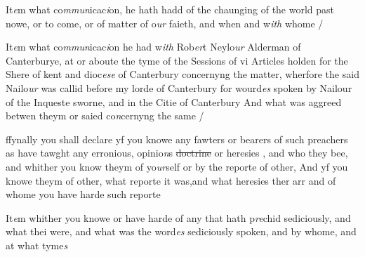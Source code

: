 \documentclass[12pt, a4paper]{book}
\begin{document}
	
				\marginpar[\vspace{0.5cm}{\textcolor{Gray}{17}}]{}
			
	
		\ifthenelse{\isodd{\thepage}}
		{\reversemarginpar}
		{\normalmarginpar}
		 It\textit{e}m what co\textit{mmun}icac\textit{i}on, he hath hadd of the chaunging of the world
 past nowe, or to come, or of matter of o\textit{ur} faieth, and when
 and w\textit{ith} whome /



				\marginpar[\vspace{0.5cm}{\textcolor{Gray}{18}}]{}
			
	
		\ifthenelse{\isodd{\thepage}}
		{\reversemarginpar}
		{\normalmarginpar}
		 It\textit{e}m what co\textit{mmun}icac\textit{i}on he had w\textit{ith} Rob\textit{er}t Neylo\textit{ur} Alderman of
		Canterburye, at or aboute the tyme of the Sessions of
		vi Articles holden for the Shere of kent and dioc\textit{ese} of Canterbury
		concernyng the matter, wherfore the said Nailo\textit{ur} was callid
		before my lorde of Canterbury for wourd\textit{es} spoken by Nailour
		of the Inqueste sworne, and in
			 the Citie of Canterbury
 And what was aggreed betwen theym or saied co\textit{n}cernyng
 the same /


	
				\marginpar[\vspace{0.5cm}{\textcolor{Gray}{19}}]{}
			
	
		\ifthenelse{\isodd{\thepage}}
		{\reversemarginpar}
		{\normalmarginpar}
		 ffynally you shall declare yf you knowe any fawters or
 bearers of such preachers as have tawght any erronious, opinio\textit{n}s
 \sout{doctrine} or heresies
			, and who they bee, and whither you know theym
 of yo\textit{ur}self or by the reporte of other, And yf you knowe theym
 of other, what reporte it was,and what heresies ther arr
 and of whome you have harde such reporte



	
				\marginpar[\vspace{0.5cm}{\textcolor{Gray}{20}}]{}
			
	
		\ifthenelse{\isodd{\thepage}}
		{\reversemarginpar}
		{\normalmarginpar}
		 It\textit{e}m whither you knowe or have harde of any that hath p\textit{re}chid
 sediciously, and what thei were, and what was the word\textit{es}
 sediciously spoken, and by whome, and at what tyme\textit{s}

               
\dotfill
						\newpage
{}
\end{document}
